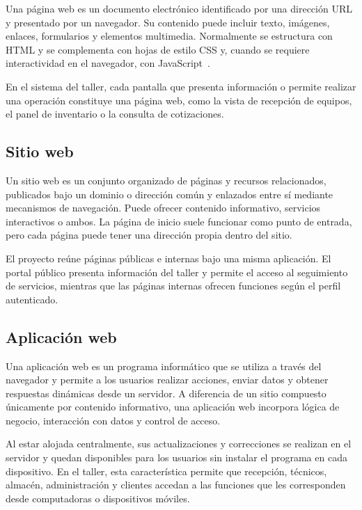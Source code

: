 Una página web es un documento electrónico identificado por una dirección URL y presentado por un navegador. Su contenido puede incluir texto, imágenes, enlaces, formularios y elementos multimedia. Normalmente se estructura con HTML y se complementa con hojas de estilo CSS y, cuando se requiere interactividad en el navegador, con JavaScript~\cite{mdn_web_dev}.

En el sistema del taller, cada pantalla que presenta información o permite realizar una operación constituye una página web, como la vista de recepción de equipos, el panel de inventario o la consulta de cotizaciones.

\subsection{Sitio web}

Un sitio web es un conjunto organizado de páginas y recursos relacionados, publicados bajo un dominio o dirección común y enlazados entre sí mediante mecanismos de navegación. Puede ofrecer contenido informativo, servicios interactivos o ambos. La página de inicio suele funcionar como punto de entrada, pero cada página puede tener una dirección propia dentro del sitio.

El proyecto reúne páginas públicas e internas bajo una misma aplicación. El portal público presenta información del taller y permite el acceso al seguimiento de servicios, mientras que las páginas internas ofrecen funciones según el perfil autenticado.

\subsection{Aplicación web}

Una aplicación web es un programa informático que se utiliza a través del navegador y permite a los usuarios realizar acciones, enviar datos y obtener respuestas dinámicas desde un servidor. A diferencia de un sitio compuesto únicamente por contenido informativo, una aplicación web incorpora lógica de negocio, interacción con datos y control de acceso.

Al estar alojada centralmente, sus actualizaciones y correcciones se realizan en el servidor y quedan disponibles para los usuarios sin instalar el programa en cada dispositivo. En el taller, esta característica permite que recepción, técnicos, almacén, administración y clientes accedan a las funciones que les corresponden desde computadoras o dispositivos móviles.

